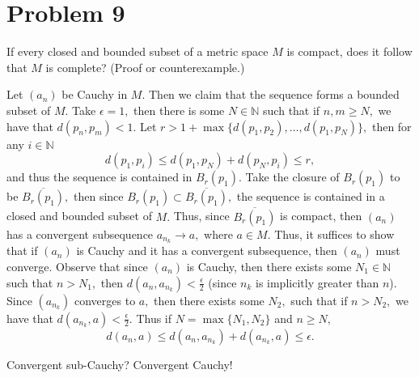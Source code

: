 \documentclass[11pt]{article}
\newcommand{\bbN}{\mathbb{N}}
\begin{document}
\newpage
\section*{Problem 9}
\begin{problem}
     If every closed and bounded subset of a metric space $M$ is compact, does it
 follow that $M$ is complete? (Proof or counterexample.)
\end{problem}
\begin{solution}
    Let $(a_n)$ be Cauchy in $M.$ Then we claim that the sequence forms a bounded subset of $M.$ Take $\epsilon =1,$ then there is some $N\in  \bbN$ such that if $n,m\geq N,$ we have that $d(p_n, p_m)<1.$ Let $r>1 + \max\{d(p_1, p_2), \dots, d(p_1,p_N)\},$ then for any $i\in \bbN$
    \[d(p_1, p_i)\leq d(p_1, p_N) + d(p_N, p_i)\leq r,\] and thus the sequence is contained in $B_r(p_1).$ Take the closure of $B_r(p_1)$ to be $\overline{B_r(p_1)},$ then since $B_r(p_1)\subset \overline{B_r(p_1)},$ the sequence is contained in a closed and bounded subset of $M.$ Thus, since $\overline{B_r(p_1)}$ is compact, then $(a_n)$ has a convergent subsequence $a_{n_k}\to a,$ where $a\in M.$ Thus, it suffices to show that if $(a_n)$ is Cauchy and it has a convergent subsequence, then $(a_n)$ must converge. Observe that since $(a_n)$ is Cauchy, then there exists some $N_1\in \bbN$ such that $n>N_1,$ then $d(a_n,a_{n_k})<\frac{\epsilon}{2}$ (since $n_k$ is implicitly greater than $n$). Since $(a_{n_k})$ converges to $a,$ then there exists some $N_2,$ such that if $n>N_2,$ we have that $d(a_{n_k},a)<\frac{\epsilon}{2}.$ Thus if $N = \max\{N_1, N_2\}$ and $n\geq N,$
    \[d(a_n, a)\leq d(a_n, a_{n_k}) + d(a_{n_k}, a)\leq \epsilon.\]
\end{solution}
\begin{reflection}
    Convergent sub-Cauchy? Convergent Cauchy!
\end{reflection}

\newpage
\end{document}
